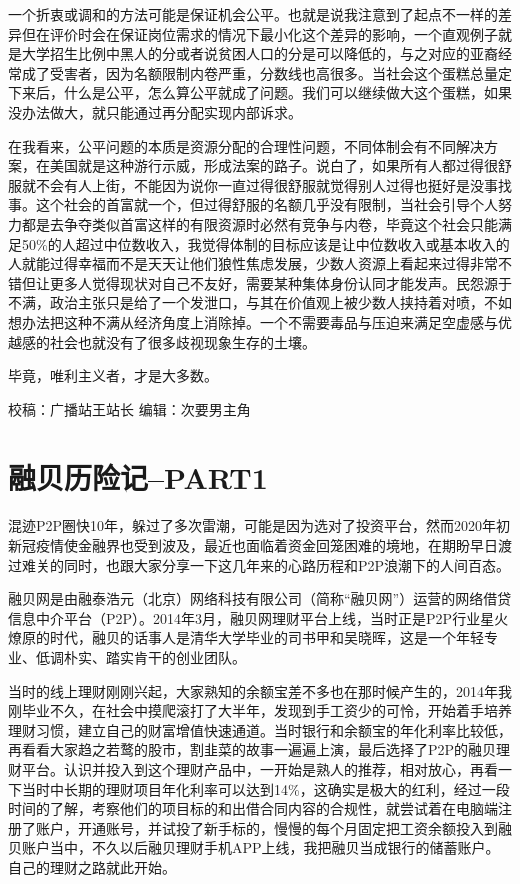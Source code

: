 \documentclass[
]{book}
\begin{document}
一个折衷或调和的方法可能是保证机会公平。也就是说我注意到了起点不一样的差异但在评价时会在保证岗位需求的情况下最小化这个差异的影响，一个直观例子就是大学招生比例中黑人的分或者说贫困人口的分是可以降低的，与之对应的亚裔经常成了受害者，因为名额限制内卷严重，分数线也高很多。当社会这个蛋糕总量定下来后，什么是公平，怎么算公平就成了问题。我们可以继续做大这个蛋糕，如果没办法做大，就只能通过再分配实现内部诉求。

在我看来，公平问题的本质是资源分配的合理性问题，不同体制会有不同解决方案，在美国就是这种游行示威，形成法案的路子。说白了，如果所有人都过得很舒服就不会有人上街，不能因为说你一直过得很舒服就觉得别人过得也挺好是没事找事。这个社会的首富就一个，但过得舒服的名额几乎没有限制，当社会引导个人努力都是去争夺类似首富这样的有限资源时必然有竞争与内卷，毕竟这个社会只能满足50\%的人超过中位数收入，我觉得体制的目标应该是让中位数收入或基本收入的人就能过得幸福而不是天天让他们狼性焦虑发展，少数人资源上看起来过得非常不错但让更多人觉得现状对自己不友好，需要某种集体身份认同才能发声。民怨源于不满，政治主张只是给了一个发泄口，与其在价值观上被少数人挟持着对喷，不如想办法把这种不满从经济角度上消除掉。一个不需要毒品与压迫来满足空虚感与优越感的社会也就没有了很多歧视现象生存的土壤。

毕竟，唯利主义者，才是大多数。

校稿：广播站王站长
编辑：次要男主角

\hypertarget{ux878dux8d1dux5386ux9669ux8bb0part1}{%
\section{融贝历险记--PART1}\label{ux878dux8d1dux5386ux9669ux8bb0part1}}

混迹P2P圈快10年，躲过了多次雷潮，可能是因为选对了投资平台，然而2020年初新冠疫情使金融界也受到波及，最近也面临着资金回笼困难的境地，在期盼早日渡过难关的同时，也跟大家分享一下这几年来的心路历程和P2P浪潮下的人间百态。

融贝网是由融泰浩元（北京）网络科技有限公司（简称``融贝网''）运营的网络借贷信息中介平台（P2P）。2014年3月，融贝网理财平台上线，当时正是P2P行业星火燎原的时代，融贝的话事人是清华大学毕业的司书甲和吴晓晖，这是一个年轻专业、低调朴实、踏实肯干的创业团队。

当时的线上理财刚刚兴起，大家熟知的余额宝差不多也在那时候产生的，2014年我刚毕业不久，在社会中摸爬滚打了大半年，发现到手工资少的可怜，开始着手培养理财习惯，建立自己的财富增值快速通道。当时银行和余额宝的年化利率比较低，再看看大家趋之若鹜的股市，割韭菜的故事一遍遍上演，最后选择了P2P的融贝理财平台。认识并投入到这个理财产品中，一开始是熟人的推荐，相对放心，再看一下当时中长期的理财项目年化利率可以达到14\%，这确实是极大的红利，经过一段时间的了解，考察他们的项目标的和出借合同内容的合规性，就尝试着在电脑端注册了账户，开通账号，并试投了新手标的，慢慢的每个月固定把工资余额投入到融贝账户当中，不久以后融贝理财手机APP上线，我把融贝当成银行的储蓄账户。自己的理财之路就此开始。
\end{document}
